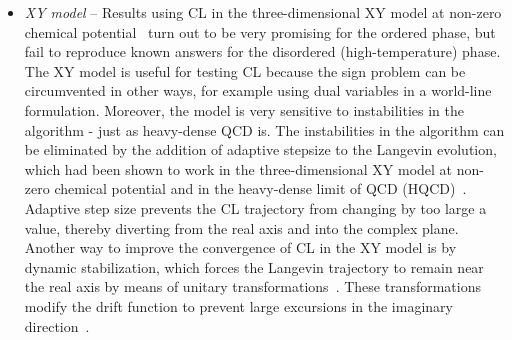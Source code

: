 \documentclass[../main.tex]{subfiles}
\begin{document}
\begin{itemize}

\item {\it XY model} --
Results using CL in the three-dimensional XY model at non-zero chemical potential~\cite{JHEP20100820} turn out to be very promising for the ordered phase, but fail to reproduce known answers for the disordered (high-temperature) phase. The XY model is useful for testing CL because the sign problem can be circumvented in other ways, for example using dual variables in a world-line formulation.
Moreover, the model is very sensitive to instabilities in the algorithm - just as heavy-dense QCD is. The instabilities in the algorithm can be eliminated by the addition of adaptive stepsize to the Langevin evolution, which had been shown to work in the three-dimensional XY model at non-zero chemical potential and in the heavy-dense limit of QCD (HQCD)~\cite{AARTS2010154}. Adaptive step size prevents the CL trajectory from changing by too large a value, thereby diverting from the real axis and into the complex plane.
Another way to improve the convergence of CL in the XY model is by dynamic stabilization, which forces the Langevin trajectory to remain near the real axis by means of unitary transformations~\cite{Lattice2017AttanasioJager}. These transformations modify the drift function to prevent large excursions in the imaginary direction~\cite{Seiler2017StatusOfCL,Lattice2016AttanasioJager}.



\end{itemize}
\end{document}
